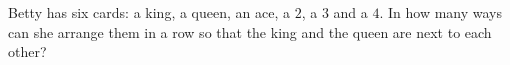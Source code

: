 Betty has six cards: a king, a queen, an ace, a $2$, a $3$ and a $4$. In how many ways can she arrange them in a row so that the king and the queen are next to each other?

